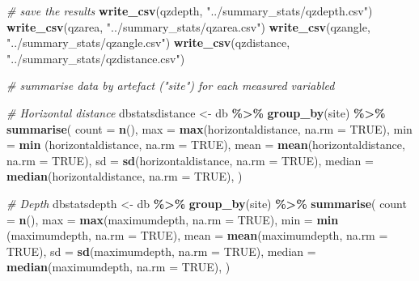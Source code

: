 \documentclass[
]{article}
\newenvironment{Shaded}{\begin{snugshade}}{\end{snugshade}}
\newcommand{\AttributeTok}[1]{\textcolor[rgb]{0.13,0.29,0.53}{#1}}
\newcommand{\CommentTok}[1]{\textcolor[rgb]{0.56,0.35,0.01}{\textit{#1}}}
\newcommand{\ConstantTok}[1]{\textcolor[rgb]{0.56,0.35,0.01}{#1}}
\newcommand{\FunctionTok}[1]{\textcolor[rgb]{0.13,0.29,0.53}{\textbf{#1}}}
\newcommand{\NormalTok}[1]{#1}
\newcommand{\OtherTok}[1]{\textcolor[rgb]{0.56,0.35,0.01}{#1}}
\newcommand{\SpecialCharTok}[1]{\textcolor[rgb]{0.81,0.36,0.00}{\textbf{#1}}}
\newcommand{\StringTok}[1]{\textcolor[rgb]{0.31,0.60,0.02}{#1}}
\begin{document}
\begin{Shaded}
\begin{Highlighting}[]
\CommentTok{\# save the results }
\FunctionTok{write\_csv}\NormalTok{(qzdepth, }\StringTok{"../summary\_stats/qzdepth.csv"}\NormalTok{)}
\FunctionTok{write\_csv}\NormalTok{(qzarea, }\StringTok{"../summary\_stats/qzarea.csv"}\NormalTok{)}
\FunctionTok{write\_csv}\NormalTok{(qzangle, }\StringTok{"../summary\_stats/qzangle.csv"}\NormalTok{)}
\FunctionTok{write\_csv}\NormalTok{(qzdistance, }\StringTok{"../summary\_stats/qzdistance.csv"}\NormalTok{)}

\CommentTok{\# summarise data by artefact ("site") for each measured variabled}

\CommentTok{\# Horizontal distance}
\NormalTok{dbstatsdistance }\OtherTok{\textless{}{-}}\NormalTok{ db }\SpecialCharTok{\%\textgreater{}\%} \FunctionTok{group\_by}\NormalTok{(site) }\SpecialCharTok{\%\textgreater{}\%}
      \FunctionTok{summarise}\NormalTok{(}
      \AttributeTok{count =} \FunctionTok{n}\NormalTok{(),}
      \AttributeTok{max =} \FunctionTok{max}\NormalTok{(horizontaldistance, }\AttributeTok{na.rm =} \ConstantTok{TRUE}\NormalTok{),}
      \AttributeTok{min =} \FunctionTok{min}\NormalTok{ (horizontaldistance, }\AttributeTok{na.rm =} \ConstantTok{TRUE}\NormalTok{),}
      \AttributeTok{mean =} \FunctionTok{mean}\NormalTok{(horizontaldistance, }\AttributeTok{na.rm =} \ConstantTok{TRUE}\NormalTok{),}
      \AttributeTok{sd =} \FunctionTok{sd}\NormalTok{(horizontaldistance, }\AttributeTok{na.rm =} \ConstantTok{TRUE}\NormalTok{),}
      \AttributeTok{median =} \FunctionTok{median}\NormalTok{(horizontaldistance, }\AttributeTok{na.rm =} \ConstantTok{TRUE}\NormalTok{),}
\NormalTok{  ) }

\CommentTok{\# Depth}
\NormalTok{dbstatsdepth }\OtherTok{\textless{}{-}}\NormalTok{ db }\SpecialCharTok{\%\textgreater{}\%} \FunctionTok{group\_by}\NormalTok{(site) }\SpecialCharTok{\%\textgreater{}\%}
      \FunctionTok{summarise}\NormalTok{(}
      \AttributeTok{count =} \FunctionTok{n}\NormalTok{(),}
      \AttributeTok{max =} \FunctionTok{max}\NormalTok{(maximumdepth, }\AttributeTok{na.rm =} \ConstantTok{TRUE}\NormalTok{),}
      \AttributeTok{min =} \FunctionTok{min}\NormalTok{ (maximumdepth, }\AttributeTok{na.rm =} \ConstantTok{TRUE}\NormalTok{),}
      \AttributeTok{mean =} \FunctionTok{mean}\NormalTok{(maximumdepth, }\AttributeTok{na.rm =} \ConstantTok{TRUE}\NormalTok{),}
      \AttributeTok{sd =} \FunctionTok{sd}\NormalTok{(maximumdepth, }\AttributeTok{na.rm =} \ConstantTok{TRUE}\NormalTok{),}
      \AttributeTok{median =} \FunctionTok{median}\NormalTok{(maximumdepth, }\AttributeTok{na.rm =} \ConstantTok{TRUE}\NormalTok{),}
\NormalTok{  ) }


\end{Highlighting}
\end{Shaded}
\end{document}
